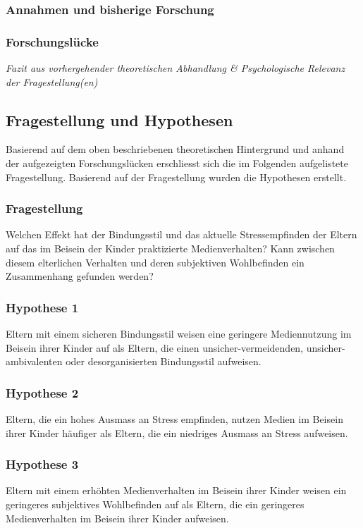 \subsubsection{Annahmen und bisherige Forschung}
\subsubsection{Forschungslücke}
\textit{Fazit aus vorhergehender theoretischen Abhandlung \& Psychologische Relevanz der Fragestellung(en)}


\subsection{Fragestellung und Hypothesen} \label{sec:Fragestellung}
Basierend auf dem oben beschriebenen theoretischen Hintergrund und anhand der aufgezeigten Forschungslücken erschliesst sich die im Folgenden aufgelistete Fragestellung. Basierend auf der Fragestellung wurden die Hypothesen erstellt.
\subsubsection{Fragestellung} 
Welchen Effekt hat der Bindungsstil und das aktuelle Stressempfinden der Eltern auf das im Beisein der Kinder praktizierte Medienverhalten? Kann zwischen diesem elterlichen Verhalten und deren subjektiven Wohlbefinden ein Zusammenhang gefunden werden?
\subsubsection{Hypothese 1}
Eltern mit einem sicheren Bindungsstil weisen eine geringere Mediennutzung im Beisein ihrer Kinder auf als Eltern, die einen unsicher-vermeidenden, unsicher-ambivalenten oder desorganisierten Bindungsstil aufweisen.
\subsubsection{Hypothese 2}
Eltern, die ein hohes Ausmass an Stress empfinden, nutzen Medien im Beisein ihrer Kinder häufiger als Eltern, die ein niedriges Ausmass an Stress aufweisen.
\subsubsection{Hypothese 3}
Eltern mit einem erhöhten Medienverhalten im Beisein ihrer Kinder weisen ein geringeres subjektives Wohlbefinden auf als Eltern, die ein geringeres Medienverhalten im Beisein ihrer Kinder aufweisen.

